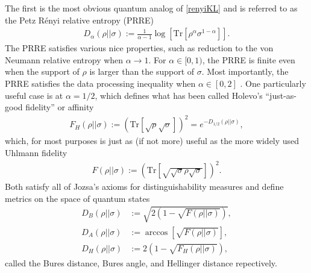 \documentclass[a4paper,11pt]{article}
\newcommand{\Tr}{\text{Tr}}
\begin{document}
The first is the most obvious quantum analog of \eqref{renyiKL} and is referred to as the Petz R\'enyi relative entropy (PRRE) \cite{1986RpMP...23...57P}
\begin{align}
    D_{\alpha}(\rho || \sigma) := \frac{1}{\alpha - 1}\log\left[ \Tr \left[\rho^{\alpha} \sigma^{1-\alpha} \right]\right].
\end{align}
The PRRE satisfies various nice properties, such as reduction to the von Neumann relative entropy when $\alpha \rightarrow 1$. For $\alpha \in [0,1)$, the PRRE is finite even when the support of $\rho$ is larger than the support of $\sigma$. Most importantly, the PRRE satisfies the data processing inequality when $\alpha \in [0, 2]$ \cite{LIEB1973267,cmp/1103900757,1986RpMP...23...57P}. One particularly useful case is at $\alpha = 1/2$, which defines what has been called Holevo's ``just-as-good fidelity'' \cite{2018arXiv180102800W} or affinity \cite{1972TMP....13.1071K}
\begin{align}
    F_H(\rho || \sigma) := \left(\Tr\left[\sqrt{\rho} \sqrt{\sigma} \right]\right)^2 =  e^{-D_{1/2}(\rho || \sigma)},
\end{align}
which, for most purposes is just as (if not more) useful as the more widely used Uhlmann fidelity
\begin{align}
    F(\rho || \sigma) := \left(\Tr \left[\sqrt{\sqrt{\sigma} \rho \sqrt{\sigma}}\right]\right)^2.
\end{align}
Both satisfy all of Jozsa's axioms for distinguishability measures \cite{doi:10.1080/09500349414552171} and define metrics on the space of quantum states
\begin{align}
    D_B(\rho || \sigma) &:= \sqrt{2\left(1-\sqrt{F(\rho ||\sigma )}\right)}, \nonumber
    \\
    D_A(\rho || \sigma) &:= \arccos\left[\sqrt{F(\rho ||\sigma )}\right], \nonumber
    \\
    D_H(\rho || \sigma) &:= 2\left(1-\sqrt{F_H(\rho ||\sigma )}\right),
\end{align}
called the Bures distance, Bures angle, and Hellinger distance repectively.
\end{document}
